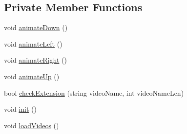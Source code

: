 \subsection*{Private Member Functions}
\begin{DoxyCompactItemize}
\item 
void \hyperlink{classVideo_a347c3f25a1b33369c668d9a560b4ea1e}{animate\+Down} ()
\item 
void \hyperlink{classVideo_a366d6b271d71a6132025554fa9d4b940}{animate\+Left} ()
\item 
void \hyperlink{classVideo_a46c85d9b2ef35927670898f4fbeadd1f}{animate\+Right} ()
\item 
void \hyperlink{classVideo_a9f4ffc4833d196e114858d217f42efdd}{animate\+Up} ()
\item 
bool \hyperlink{classVideo_a9544892192e1b8baa83418c789bb9410}{check\+Extension} (string video\+Name, int video\+Name\+Len)
\item 
void \hyperlink{classVideo_abe9ac37aaef5921270d0d68d27fabe87}{init} ()
\item 
void \hyperlink{classVideo_ad73b6ab89339073bc731c01c562734e8}{load\+Videos} ()
\end{DoxyCompactItemize}
